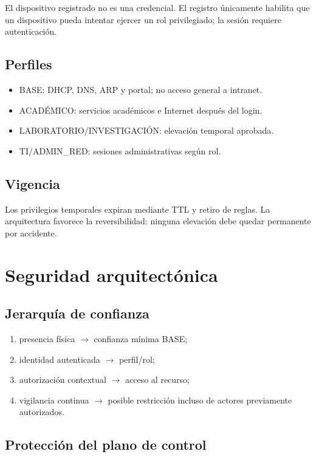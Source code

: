 \documentclass[11pt,a4paper]{article}
\begin{document}
El dispositivo registrado no es una credencial. El registro únicamente habilita que un dispositivo pueda intentar ejercer un rol privilegiado; la sesión requiere autenticación.

\subsection{Perfiles}

\begin{itemize}
\item BASE: DHCP, DNS, ARP y portal; no acceso general a intranet.
\item ACADÉMICO: servicios académicos e Internet después del login.
\item LABORATORIO/INVESTIGACIÓN: elevación temporal aprobada.
\item TI/ADMIN\_RED: sesiones administrativas según rol.
\end{itemize}

\subsection{Vigencia}

Los privilegios temporales expiran mediante TTL y retiro de reglas. La arquitectura favorece la reversibilidad: ninguna elevación debe quedar permanente por accidente.

\section{Seguridad arquitectónica}

\subsection{Jerarquía de confianza}

\begin{enumerate}
\item presencia física \(\rightarrow\) confianza mínima BASE;
\item identidad autenticada \(\rightarrow\) perfil/rol;
\item autorización contextual \(\rightarrow\) acceso al recurso;
\item vigilancia continua \(\rightarrow\) posible restricción incluso de actores previamente autorizados.
\end{enumerate}

\subsection{Protección del plano de control}
\end{document}
